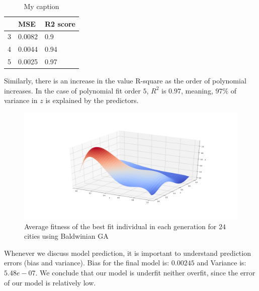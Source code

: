 \documentclass [11pt]{article}
\begin{document}
\begin{table}[H]
\centering
\begin{tabular}{lll}
\hline
  & MSE    & R2 score \\ \hline
3 & 0.0082 & 0.9      \\
4 & 0.0044 & 0.94     \\
5 & 0.0025 & 0.97     \\ \hline
\end{tabular}%
\caption{My caption}
\label{tab:olsFranke}
\end{table}
Similarly, there is an increase in the value R-square as the order of polynomial increases. In the case of polynomial fit order $5$, $R^{2}$ is $0.97$, meaning, $97\%$ of variance in $z$ is explained by the predictors. 
\begin{figure}[H]
\centering
\includegraphics[width=1\textwidth]{figures/olsFranke.png}
        \caption{Average fitness of the best fit individual in each generation for $24$ cities using Baldwinian GA}
        \label{fig:olsFranke}
\end{figure}
Whenever we discuss model prediction, it is important to understand prediction errors (bias and variance). Bias for the final model is: $0.00245$ and Variance is: $5.48e-07$. We conclude that our model is underfit neither overfit, since the error of our model is relatively low.
\end{document}
